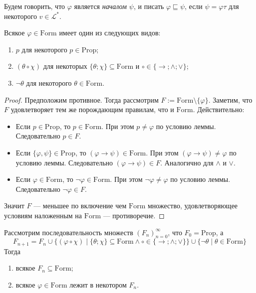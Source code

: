 \documentclass[12pt,a4paper]{article}
\newcommand{\Prop}{\ensuremath{\mathrm{Prop}}\xspace}
\newcommand{\Formul}{\ensuremath{\mathrm{Form}}\xspace}
\begin{document}
    \begin{definition}
        Будем говорить, что $\varphi$ является \emph{началом $\psi$}, и писать $\varphi \sqsubseteq \psi$, если $\psi = \varphi \tau$ для некоторого $v \in \mathscr{L}^*$.
    \end{definition}

    \begin{lemma}
        Всякое $\varphi \in \Formul$ имеет один из следующих видов:
        \begin{enumerate}
            \item $p$ для некоторого $p \in \Prop$;
            \item $(\theta \circ \chi)$ для некоторых $\{\theta; \chi\} \subseteq \Formul$ и $\circ \in \{\rightarrow; \wedge; \vee\}$;
            \item $\neg \theta$ для некоторого $\theta \in \Formul$.
        \end{enumerate}
    \end{lemma}

    \begin{proof}
        Предположим противное. Тогда рассмотрим $F := \Formul \setminus \{\varphi\}$. Заметим, что $F$ удовлетворяет тем же порождающим правилам, что и $\Formul$. Действительно:
        \begin{itemize}
            \item Если $p \in \Prop$, то $p \in \Formul$. При этом $p \neq \varphi$ по условию леммы. Следовательно $p \in F$.
            \item Если $\{\varphi, \psi\} \in \Prop$, то $(\varphi \rightarrow \psi) \in \Formul$. При этом $(\varphi \rightarrow \psi) \neq \varphi$ по условию леммы. Следовательно $(\varphi \rightarrow \psi) \in F$. Аналогично для $\wedge$ и $\vee$.
            \item Если $\varphi \in \Formul$, то $\neg \varphi \in \Formul$. При этом $\neg \varphi \neq \varphi$ по условию леммы. Следовательно $\neg \varphi \in F$.
        \end{itemize}
        Значит $F$ --- меньшее по включение чем $\Formul$ множество, удовлетворяющее условиям наложенным на $\Formul$ --- противоречие.
    \end{proof}

    \begin{corollary}
        Рассмотрим последовательность множеств $(F_n)_{n=0}^\infty$, что $F_0 = \Prop$, а
        \[
            F_{n+1} = F_n 
            \cup \{(\varphi \circ \chi) \mid \{\theta; \chi\} \subseteq \Formul \wedge \circ \in \{\rightarrow; \wedge; \vee\}\}
            \cup \{\neg \theta \mid \theta \in \Formul\}
        \]
        Тогда
        \begin{enumerate}
            \item всякое $F_n \subseteq \Formul$;
            \item всякое $\varphi \in \Formul$ лежит в некотором $F_n$.
        \end{enumerate}
    \end{corollary}
\end{document}
